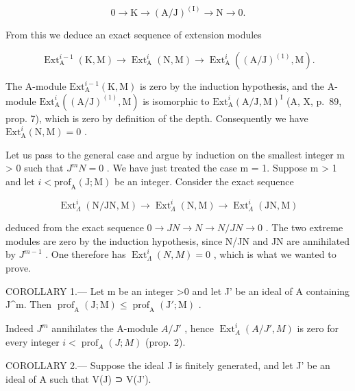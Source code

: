 \[
0 \rightarrow \mathrm{K} \longrightarrow (\mathrm{A} / \mathrm{J}) ^ {(\mathrm{I})} \longrightarrow \mathrm{N} \rightarrow 0.
\]

From this we deduce an exact sequence of extension modules

\[
\operatorname{Ext} _ {\mathrm{A}} ^ {i - 1} (\mathrm{K}, \mathrm{M}) \longrightarrow \operatorname{Ext} _ {\mathrm{A}} ^ {i} (\mathrm{N}, \mathrm{M}) \longrightarrow \operatorname{Ext} _ {\mathrm{A}} ^ {i} ((\mathrm{A} / \mathrm{J}) ^ {(1)}, \mathrm{M}).
\]

The A-module \(\mathrm{Ext}_{\mathrm{A}}^{i-1}(\mathrm{K},\mathrm{M})\) is zero by the induction hypothesis, and the A-module \(\mathrm{Ext}_{\mathrm{A}}^{i}((\mathrm{A}/\mathrm{J})^{(1)},\mathrm{M})\) is isomorphic to \(\mathrm{Ext}_{\mathrm{A}}^{i}(\mathrm{A}/\mathrm{J},\mathrm{M})^{\mathrm{I}}\) (A, X, p.~89, prop. 7), which is zero by definition of the depth. Consequently we have \(\mathrm{Ext}_{\mathrm{A}}^{i}(\mathrm{N},\mathrm{M}) = 0\) .

Let us pass to the general case and argue by induction on the smallest integer m \textgreater{} 0 such that \(J^{m}N = 0\) . We have just treated the case m = 1. Suppose m \textgreater{} 1 and let \(i < \text{prof}_{\text{A}}(\text{J}; \text{M})\) be an integer. Consider the exact sequence

\[
\operatorname{Ext} _ {\Lambda} ^ {i} (\mathrm{N/JN,M}) \longrightarrow \operatorname{Ext} _ {\Lambda} ^ {i} (\mathrm{N,M}) \longrightarrow \operatorname{Ext} _ {\Lambda} ^ {i} (\mathrm{JN,M})
\]

deduced from the exact sequence \(0 \rightarrow JN \rightarrow N \rightarrow N/JN \rightarrow 0\) . The two extreme modules are zero by the induction hypothesis, since N/JN and JN are annihilated by \(J^{m-1}\) . One therefore has \(\operatorname{Ext}_{\Lambda}^{i}(N,M) = 0\) , which is what we wanted to prove.

COROLLARY 1.--- Let m be an integer \textgreater0 and let J' be an ideal of A containing J\^{}m. Then \(\operatorname{prof}_{\mathrm{A}}(\mathrm{J};\mathrm{M}) \leqslant \operatorname{prof}_{\mathrm{A}}(\mathrm{J}';\mathrm{M})\) .

Indeed \(J^{m}\) annihilates the A-module \(A/J'\) , hence \(\operatorname{Ext}_{A}^{i}(A/J', M)\) is zero for every integer \(i < \operatorname{prof}_{A}(J; M)\) (prop. 2).

COROLLARY 2.--- Suppose the ideal J is finitely generated, and let J' be an ideal of A such that V(J) ⊃ V(J').

